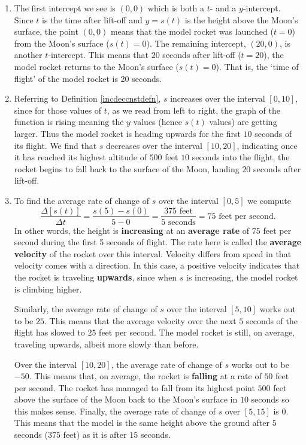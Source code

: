 \documentclass{ximera}
\begin{document}
\begin{example}
\begin{explanation}
\begin{enumerate}
\item The first intercept we see is $(0, 0)$ which is both a $t$- and a $y$-intercept.  Since $t$ is the time after lift-off and $y = s(t)$ is  the height above the Moon's surface, the point $(0, 0)$ means that the model rocket was launched ($t=0$) from the Moon's surface ($s(t) = 0$).  The remaining intercept, $(20, 0)$,  is another $t$-intercept.  This means that $20$ seconds after lift-off ($t=20$), the model rocket returns to the Moon's surface ($s(t) = 0$).   That is, the `time of flight' of the model rocket is 20 seconds.

\item  Referring to Definition \ref{incdeccnstdefn}, $s$ increases over the interval $[0, 10]$, since for those values of $t$, as we read from left to right, the graph of the function is rising meaning the $y$ values (hence $s(t)$ values) are getting larger. Thus the model rocket is heading upwards for the first $10$ seconds of its flight.  We find that $s$ decreases over the interval $[10, 20]$, indicating once it has reached its highest altitude of $500$ feet $10$ seconds into the flight, the rocket begins to fall back to the surface of the Moon, landing $20$ seconds after lift-off.

\item  To find the average rate of change of $s$ over the interval $[0, 5]$ we compute \[ \dfrac{\Delta[s(t)]}{\Delta t} = \dfrac{s(5) - s(0)}{5 - 0} = \dfrac{\text{$375$ feet}}{\text{$5$ seconds}} = \text{$75$ feet per second}.\] In other words, the height is \textbf{increasing} at an \textbf{average rate} of $75$ feet per second during the first 5 seconds of flight.  The rate here is called the  \textbf{average velocity} of the rocket over this interval.  Velocity differs from speed in that velocity comes with a direction.  In this case, a positive velocity indicates that the rocket is traveling \textbf{upwards}, since when $s$ is increasing, the model rocket is climbing higher.  



Similarly, the average rate of change of $s$ over the interval $[5, 10]$ works out to be $25$.  This means that the average velocity over the next $5$ seconds of the flight has slowed to $25$ feet per second. The model rocket is still, on average, traveling upwards, albeit more slowly than before.  



Over the interval $[10, 20]$, the average rate of change of $s$ works out to be $-50$.  This means that, on average, the rocket is \textbf{falling} at a rate of $50$ feet per second.  The rocket has managed to fall from its highest point $500$ feet above the surface of the Moon back to the Moon's surface in $10$ seconds so this makes sense. Finally, the average rate of change of $s$ over $[5, 15]$ is $0$.  This means that the model is the same height above the ground after $5$ seconds ($375$ feet) as it is after $15$ seconds.    




\end{enumerate}
\end{explanation}
\end{example}
\end{document}
